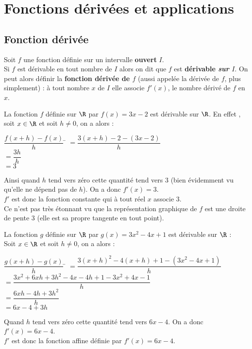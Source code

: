 \documentclass[a4paper,11pt,cours]{nsi} %
\begin{document}
\setcounter{chapter}{7} %



\chapter{Fonctions dérivées et applications}


\setlength{\columnseprule}{0.5pt}
\setlength{\columnsep}{1cm}

\section{Fonction dérivée}
\begin{definition}
	Soit $f$ une fonction définie sur un intervalle \textbf{ouvert} $I$.\\
	Si $f$ est dérivable en tout nombre de $I$ alors on dit que $f$ est 
	{\boldmath\textbf{dérivable \emph{sur} $I$}}. On peut alors définir la {\boldmath\textbf{fonction dérivée de $f$}} (aussi appelée la dérivée 
	de $f$, plus simplement) : à tout nombre $x$ de $I$ elle associe $f'(x)$, le nombre dérivé de $f$ en $x$.
\end{definition}

\begin{exemple}[ 1]
	La fonction $f$ définie sur $\R$ par $f(x)=3x-2$ est dérivable sur $\R$. En effet , soit $x\in\R$ et soit $h\neq 0$, on a alors :
	\begin{tabbing}
		$\dfrac{f(x+h)-f(x)}{h}$	\=	$=\dfrac{3(x+h)-2-(3x-2)}{h}$\\
		\>	$=\dfrac{3h}{h}$\\	
		\>	$=3$
	\end{tabbing}
	Ainsi quand $h$ tend vers zéro cette quantité tend vers $3$ (bien évidemment vu qu'elle ne dépend pas de $h$). On a donc $f'(x)=3$.\\
	$f'$ est donc la fonction constante qui à tout réel $x$ associe $3$.\\
	Ce n'est pas très étonnant vu que la représentation graphique de $f$ est une droite de pente $3$ (elle est sa propre tangente en tout point).
\end{exemple}

\begin{exemple}[ 2]
	La fonction $g$ définie sur $\R$ par $g(x)=3x^2-4x+1$ est dérivable sur $\R$ : \\
	Soit $x\in\R$ et soit $h\neq 0$, on a alors :
	\begin{tabbing}
		$\dfrac{g(x+h)-g(x)}{h}$	\=	$=\dfrac{3(x+h)^2-4(x+h)+1-(3x^2-4x+1)}{h}$\\
		\>	$=\dfrac{3x^2+6xh+3h^2-4x-4h+1-3x^2+4x-1}{h}$\\	
		\>	$=\dfrac{6xh-4h+3h^2}{h}$\\
		\>	$=6x-4+3h$
	\end{tabbing}
	Quand $h$ tend vers zéro cette quantité tend vers $6x-4$. On a donc $f'(x)=6x-4$.\\
	$f'$ est donc la fonction affine définie par $f'(x)=6x-4$.
\end{exemple}
\end{document}
